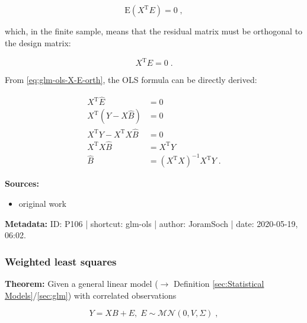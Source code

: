 \documentclass[a4paper,12pt,twoside]{book}
\begin{document}
\begin{equation} \label{eq:glm-ols-OLS-uncorr}
\mathrm{E}(X^\mathrm{T} E) = 0 \; ,
\end{equation}

which, in the finite sample, means that the residual matrix must be orthogonal to the design matrix:

\begin{equation} \label{eq:glm-ols-X-E-orth}
X^\mathrm{T} \hat{E} = 0 \; .
\end{equation}

From \eqref{eq:glm-ols-X-E-orth}, the OLS formula can be directly derived:

\begin{equation} \label{eq:glm-ols-OLS-qed}
\begin{split}
X^\mathrm{T} \hat{E} &= 0 \\
X^\mathrm{T} \left( Y - X\hat{B} \right) &= 0 \\
X^\mathrm{T} Y - X^\mathrm{T} X\hat{B} &= 0 \\
X^\mathrm{T} X\hat{B} &= X^\mathrm{T} Y \\
\hat{B} &= (X^\mathrm{T} X)^{-1} X^\mathrm{T} Y \; .
\end{split}
\end{equation}


\vspace{1em}
\textbf{Sources:}
\begin{itemize}
\item original work\end{itemize}


\vspace{1em}
\textbf{Metadata:} ID: P106 | shortcut: glm-ols | author: JoramSoch | date: 2020-05-19, 06:02.
\vspace{1em}



\subsubsection[\textbf{Weighted least squares}]{Weighted least squares} \label{sec:glm-wls}
\setcounter{equation}{0}

\textbf{Theorem:} Given a general linear model ($\rightarrow$ Definition \ref{sec:Statistical Models}/\ref{sec:glm}) with correlated observations

\begin{equation} \label{eq:glm-wls-GLM}
Y = X B + E, \; E \sim \mathcal{MN}(0, V, \Sigma) \; ,
\end{equation}
\end{document}
